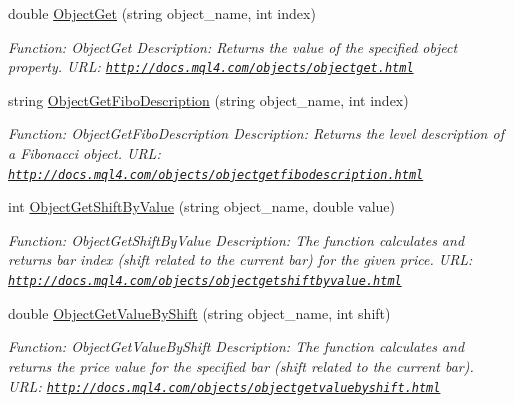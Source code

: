 \begin{DoxyCompactItemize}
double \hyperlink{class_m_q_l4_c_sharp_1_1_base_1_1_m_q_l_base_a18383cb1788671321d8c93ff38b392c3}{Object\+Get} (string object\+\_\+name, int index)
\begin{DoxyCompactList}\small\item\em Function\+: Object\+Get Description\+: Returns the value of the specified object property. U\+RL\+: \href{http://docs.mql4.com/objects/objectget.html}{\tt http\+://docs.\+mql4.\+com/objects/objectget.\+html} \end{DoxyCompactList}\item 
string \hyperlink{class_m_q_l4_c_sharp_1_1_base_1_1_m_q_l_base_adef4dcc047cfa374b5cccbea7f5220f2}{Object\+Get\+Fibo\+Description} (string object\+\_\+name, int index)
\begin{DoxyCompactList}\small\item\em Function\+: Object\+Get\+Fibo\+Description Description\+: Returns the level description of a Fibonacci object. U\+RL\+: \href{http://docs.mql4.com/objects/objectgetfibodescription.html}{\tt http\+://docs.\+mql4.\+com/objects/objectgetfibodescription.\+html} \end{DoxyCompactList}\item 
int \hyperlink{class_m_q_l4_c_sharp_1_1_base_1_1_m_q_l_base_ae0652e80833a7a22499204f74813f0fd}{Object\+Get\+Shift\+By\+Value} (string object\+\_\+name, double value)
\begin{DoxyCompactList}\small\item\em Function\+: Object\+Get\+Shift\+By\+Value Description\+: The function calculates and returns bar index (shift related to the current bar) for the given price. U\+RL\+: \href{http://docs.mql4.com/objects/objectgetshiftbyvalue.html}{\tt http\+://docs.\+mql4.\+com/objects/objectgetshiftbyvalue.\+html} \end{DoxyCompactList}\item 
double \hyperlink{class_m_q_l4_c_sharp_1_1_base_1_1_m_q_l_base_af627d24d503d845109eb610cb09f68ec}{Object\+Get\+Value\+By\+Shift} (string object\+\_\+name, int shift)
\begin{DoxyCompactList}\small\item\em Function\+: Object\+Get\+Value\+By\+Shift Description\+: The function calculates and returns the price value for the specified bar (shift related to the current bar). U\+RL\+: \href{http://docs.mql4.com/objects/objectgetvaluebyshift.html}{\tt http\+://docs.\+mql4.\+com/objects/objectgetvaluebyshift.\+html} \end{DoxyCompactList}\item 

\end{DoxyCompactItemize}
